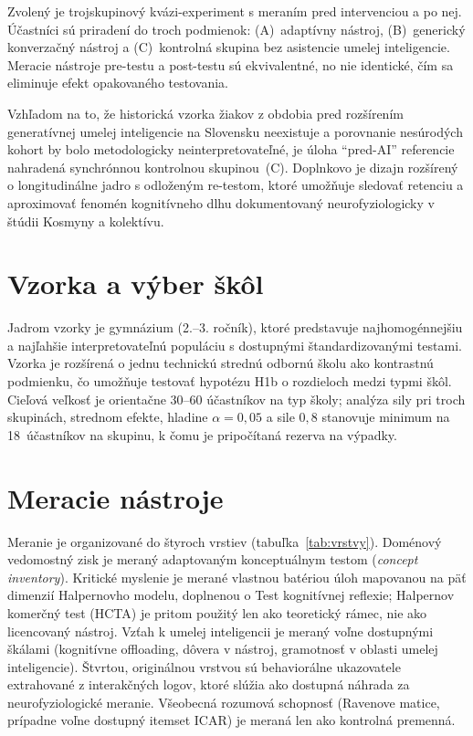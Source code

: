 \begin{aibar}
Zvolený je trojskupinový kvázi-experiment s meraním pred intervenciou a po
nej. Účastníci sú priradení do troch podmienok: (A)~adaptívny nástroj,
(B)~generický konverzačný nástroj a (C)~kontrolná skupina bez asistencie
umelej inteligencie. Meracie nástroje pre-testu a post-testu sú ekvivalentné,
no nie identické, čím sa eliminuje efekt opakovaného testovania.

Vzhľadom na to, že historická vzorka žiakov z obdobia pred rozšírením
generatívnej umelej inteligencie na Slovensku neexistuje a porovnanie
nesúrodých kohort by bolo metodologicky neinterpretovateľné, je úloha
``pred-AI'' referencie nahradená synchrónnou kontrolnou skupinou~(C).
Doplnkovo je dizajn rozšírený o longitudinálne jadro s odloženým re-testom,
ktoré umožňuje sledovať retenciu a aproximovať fenomén kognitívneho dlhu
dokumentovaný neurofyziologicky v štúdii Kosmyny a kolektívu.


\section{Vzorka a výber škôl}
\label{sec:sample}

Jadrom vzorky je gymnázium (2.--3. ročník), ktoré predstavuje najhomogénnejšiu
a najľahšie interpretovateľnú populáciu s dostupnými štandardizovanými testami.
Vzorka je rozšírená o jednu technickú strednú odbornú školu ako kontrastnú
podmienku, čo umožňuje testovať hypotézu H1b o rozdieloch medzi typmi škôl.
Cieľová veľkosť je orientačne 30--60 účastníkov na typ školy; analýza sily pri
troch skupinách, strednom efekte, hladine $\alpha = 0{,}05$ a sile $0{,}8$
stanovuje minimum na 18~účastníkov na skupinu, k čomu je pripočítaná rezerva na
výpadky.


\section{Meracie nástroje}
\label{sec:instruments}

Meranie je organizované do štyroch vrstiev (tabuľka~\ref{tab:vrstvy}).
Doménový vedomostný zisk je meraný adaptovaným konceptuálnym testom
(\emph{concept inventory}). Kritické myslenie je merané vlastnou batériou úloh
mapovanou na päť dimenzií Halpernovho modelu, doplnenou o Test kognitívnej
reflexie; Halpernov komerčný test (HCTA) je pritom použitý len ako teoretický
rámec, nie ako licencovaný nástroj. Vzťah k umelej inteligencii je meraný
voľne dostupnými škálami (kognitívne offloading, dôvera v nástroj, gramotnosť v
oblasti umelej inteligencie). Štvrtou, originálnou vrstvou sú behaviorálne
ukazovatele extrahované z interakčných logov, ktoré slúžia ako dostupná
náhrada za neurofyziologické meranie. Všeobecná rozumová schopnosť
(Ravenove matice, prípadne voľne dostupný itemset ICAR) je meraná len ako
kontrolná premenná.


\end{aibar}
